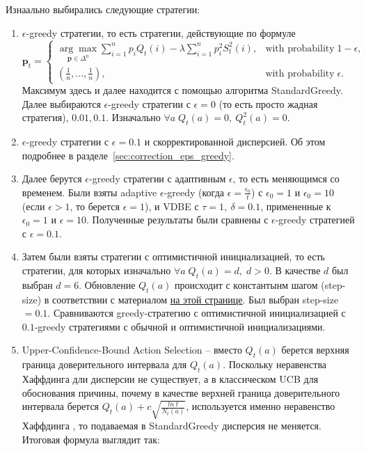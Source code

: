 \documentclass{article}
\begin{document}
Изнаально выбирались следующие стратегии:
\begin{enumerate}
    \item $\epsilon$-greedy стратегии, то есть стратегии, действующие по формуле
    $$\textbf{p}_t = \begin{cases}
            \underset{\textbf{p} \in \Delta^n}{\arg \max} \sum_{i=1}^n p_i Q_t(i) - \lambda \sum_{i=1}^n p_i^2 S_t^2(i), & \text{with probability} \; 1 - \epsilon, \\
            (\frac{1}{n}, ..., \frac{1}{n}), & \text{with probability} \; \epsilon.
            \end{cases}$$ 
    Максимум здесь и далее находится с помощью алгоритма StandardGreedy. Далее выбираются $\epsilon$-greedy стратегии с $\epsilon = 0$ (то есть просто жадная стратегия), $0.01, 0.1$. Изначально $\forall a \; Q_t(a) = 0, \: Q_t^2(a) = 0$.
    \item $\epsilon$-greedy стратегии с $\epsilon=0.1$ и скорректированной дисперсией. Об этом подробнее в разделе~\ref{sec:correction_eps_greedy}.
    \item Далее берутся $\epsilon$-greedy стратегии с адаптивным $\epsilon$, то есть меняющимся со временем. Были взяты adaptive $\epsilon$-greedy (когда $\epsilon = \frac{\epsilon_0}{t}$) с $\epsilon_0=1$ и $\epsilon_0=10$ (если $\epsilon > 1$, то берется $\epsilon=1$), и VDBE с $\tau=1, \: \delta=0.1$, примененные к $\epsilon_0=1$ и $\epsilon=10$. Полученные результаты были сравнены с $\epsilon$-greedy стратегией с $\epsilon=0.1$.
    \item Затем были взяты стратегии с оптимистичной инициализацией, то есть стратегии, для которых изначально $\forall a \; Q_t(a) = d, \; d > 0$. В качестве  $d$ был выбран $d=6$. Обновление $Q_t(a)$ происходит с константынм шагом (step-size) в соответствии с материалом \href{https://matteosantama.github.io/ewm/}{на этой странице}. Был выбран step-size$ = 0.1$. Сравниваются greedy-стратегию с оптимистичной инициализацией с $0.1$-greedy стратегиями с обычной и оптимистичной инициализациями.
    \item Upper-Confidence-Bound Action Selection -- вместо $Q_t(a)$ берется верхняя граница доверительного интервала для $Q_t(a)$. Поскольку неравенства Хаффдинга дли дисперсии не существует, а в классическом UCB для обоснования причины, почему в качестве верхней граница доверительного интервала берется $Q_t(a) + c \sqrt{\frac{ln \; t}{N_t(a)}}$, используется именно неравенство Хаффдинга \cite{intro_to_multiarmed}, то подаваемая в StandardGreedy дисперсия не меняется. Итоговая формула выглядит так:

\end{enumerate}
\end{document}

